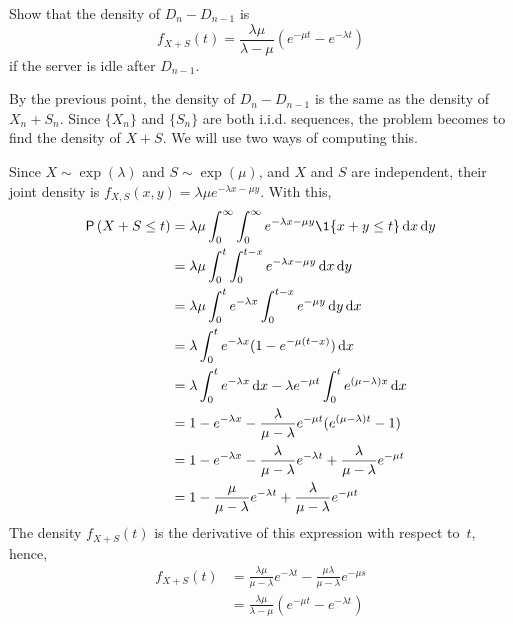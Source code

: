 \begin{exercise}
Show that the density of $D_{n} - D_{n-1}$ is
    \begin{equation*}
    f_{X+S}(t) = \frac{\lambda \mu}{\lambda - \mu} (e^{-\mu t} - e^{-\lambda t})
    \end{equation*}
if the server is idle after $D_{n-1}$.
    \begin{solution}
      By the previous point, the density of $D_{n} - D_{n-1}$ is the
      same as the density of $X_n + S_n$.  Since $\{X_n\}$ and $\{S_n\}$ are both i.i.d. sequences, the problem becomes to find the density of $X+S$.  We will use two ways of computing this. 

\newpage
Since $X\sim \exp(\lambda)$ and $S\sim\exp(\mu)$, and $X$ and $S$ are independent, their joint density is $f_{X,S}(x,y) = \lambda \mu e^{-\lambda x - \mu y}$. With this,
  \begin{align*}
\P{X+S\leq t } 
&= \lambda \mu \int_0^\infty \int_0^\infty e^{-\lambda x - \mu y} \1{x+y\leq t} \d x \d y \\
&= \lambda \mu \int_0^t \int_0^{t-x} e^{-\lambda x - \mu y} \d x \d y \\
&= \lambda \mu \int_0^t e^{-\lambda x} \int_0^{t-x} e^{- \mu y} \d y \d x \\
&= \lambda \int_0^t e^{-\lambda x} (1-e^{- \mu (t-x)} ) \d x  \\
&= \lambda \int_0^t e^{-\lambda x}  \d x - \lambda e^{-\mu t} \int_0^t e^{(\mu-\lambda) x} \d x \\
&= 1- e^{-\lambda x} - \frac{\lambda}{\mu-\lambda} e^{-\mu t} ( e^{(\mu-\lambda) t} -1) \\
&= 1- e^{-\lambda x} - \frac{\lambda}{\mu-\lambda} e^{-\lambda t} + \frac{\lambda}{\mu-\lambda} e^{-\mu t} \\ 
&= 1 - \frac{\mu}{\mu-\lambda} e^{-\lambda t} + \frac{\lambda}{\mu-\lambda} e^{-\mu t} \\
  \end{align*}
The density $f_{X+S}(t)$ is the derivative of this expression with respect to~$t$, hence,
\begin{align*}
  f_{X+S}(t) 
&= \frac{\lambda\mu}{\mu-\lambda} e^{-\lambda t}  - \frac{\mu \lambda}{\mu-\lambda} e^{-\mu s} \\
&= \frac{\lambda\mu}{\lambda -\mu}(e^{-\mu t} - e^{-\lambda t}) \\
\end{align*}


\end{solution}
\end{exercise}

